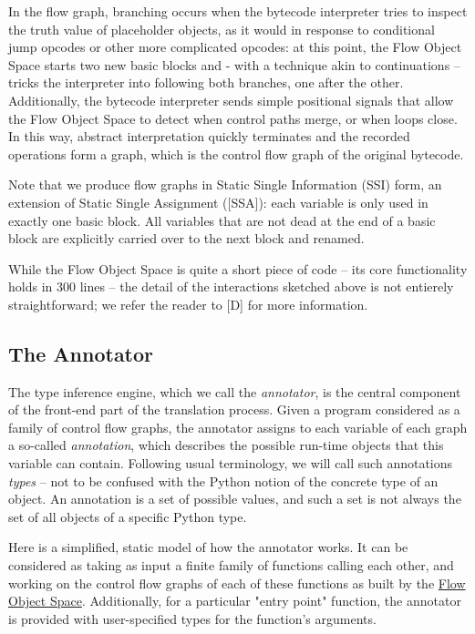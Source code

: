 \documentclass{acm_proc_article-sp}
\begin{document}
In the flow graph, branching occurs when the bytecode interpreter tries
to inspect the truth value of placeholder objects, as it would in
response to conditional jump opcodes or other more complicated opcodes:
at this point, the Flow Object Space starts two new basic blocks and -
with a technique akin to continuations -- tricks the interpreter into
following both branches, one after the other.  Additionally, the
bytecode interpreter sends simple positional signals that allow the Flow
Object Space to detect when control paths merge, or when loops close.
In this way, abstract interpretation quickly terminates and the recorded
operations form a graph, which is the control flow graph of the original
bytecode.

Note that we produce flow graphs in Static Single Information (SSI)
form, an extension of Static Single Assignment ([SSA]): each variable is
only used in exactly one basic block.  All variables that are not dead
at the end of a basic block are explicitly carried over to the next
block and renamed.

While the Flow Object Space is quite a short piece of code -- its core
functionality holds in 300 lines -- the detail of the interactions
sketched above is not entierely straightforward; we refer the reader to
[D] for more information.


\subsection{The Annotator}

The type inference engine, which we call the \textit{annotator}, is the central
component of the front-end part of the translation process.  Given a
program considered as a family of control flow graphs, the annotator
assigns to each variable of each graph a so-called \textit{annotation}, which
describes the possible run-time objects that this variable can contain.
Following usual terminology, we will call such annotations \textit{types} -- not
to be confused with the Python notion of the concrete type of an object.
An annotation is a set of possible values, and such a set is not always
the set of all objects of a specific Python type.

Here is a simplified, static model of how the annotator works.  It can
be considered as taking as input a finite family of functions calling
each other, and working on the control flow graphs of each of these
functions as built by the \href{flowobjspace}{Flow Object Space}.
Additionally, for a particular "entry point" function, the annotator
is provided with user-specified types for the function's arguments.
\end{document}
